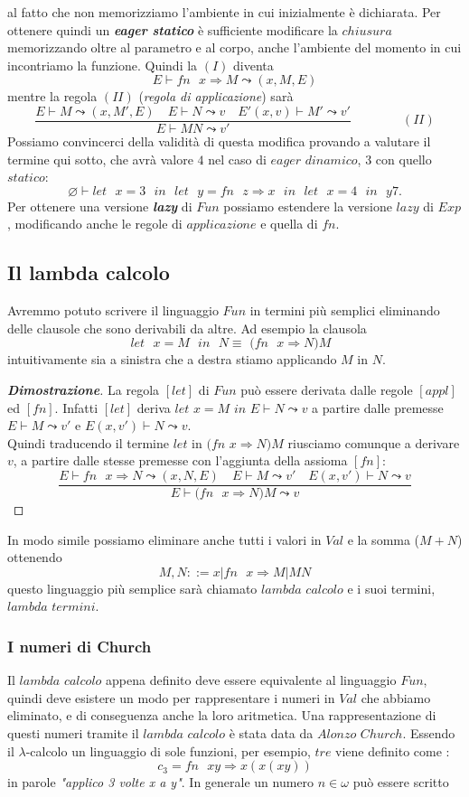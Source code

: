 \documentclass{article}
\theoremstyle{definition}
\theoremstyle{definition}
\theoremstyle{definition}
\theoremstyle{remark}
\begin{document}
al fatto che non memorizziamo l'ambiente in cui inizialmente è dichiarata. Per ottenere quindi un \textbf{\textit{eager statico}} è sufficiente modificare la $chiusura$ memorizzando oltre al parametro e al corpo, anche l'ambiente
del momento in cui incontriamo la funzione.
Quindi la $(I)$ diventa
$$E\vdash\text{$fn$ $x\Rightarrow M$}\leadsto(x,M,E)$$
mentre la regola $(II)$ (\textit{regola di applicazione}) sarà
$$\frac{E\vdash M \leadsto (x,M',E) \quad E \vdash N\leadsto v \quad E'(x,v)\vdash M'\leadsto v'}{E\vdash MN\leadsto v'}\qquad \qquad (II)$$
Possiamo convincerci della validità di questa modifica provando a valutare il termine qui sotto, che avrà valore $4$ nel caso di $eager$ $dinamico$, $3$ con quello $statico$:
$$\varnothing\vdash \text{$let$ $x=3$ $in$ $let$ $y=fn$ $z\Rightarrow x$ $in$ $let$ $x=4$ $in$ $y7$.}$$
Per ottenere una versione \textbf{\textit{lazy}} di $Fun$ possiamo estendere la versione $lazy$ di $Exp$, modificando anche le regole di $applicazione$ e quella di $fn$.
\subsection{Il lambda calcolo}
Avremmo potuto scrivere il linguaggio $Fun$ in termini più semplici eliminando delle clausole che sono derivabili da altre. Ad esempio la clausola
$$\text{$let$ $x=M$ $in$ $N \equiv$ ($fn$ $x\Rightarrow N)M$  }$$
intuitivamente sia a sinistra che a destra stiamo applicando $M$ in $N$.
\begin{proof}[\textbf{Dimostrazione}]
    La regola $[let]$ di $Fun$ può essere derivata dalle regole  $[appl]$ ed $[fn]$. Infatti $[let]$ deriva $let$ $x=M$ $in$ $E\vdash N\leadsto v$ a partire dalle premesse
    $E\vdash M\leadsto v'$  e $E(x,v')\vdash N \leadsto v$. \\Quindi  traducendo il termine $let$ in  $(fn$ $x\Rightarrow N)M$ riusciamo comunque a derivare $v$, a partire dalle stesse premesse  con l'aggiunta della assioma $[fn]$:
    $$\frac{E\vdash \text{$fn$ $x\Rightarrow N\leadsto (x,N,E)$}\quad E\vdash M\leadsto v' \quad E(x,v')\vdash N \leadsto v  }{E\vdash \text{$(fn$ $x\Rightarrow N)M\leadsto v$}}$$
\end{proof}
In modo simile possiamo eliminare anche tutti i valori in $Val$ e la somma ($M+N$) ottenendo
$$M,N ::= x|\text{$fn$ $x\Rightarrow M|MN$}$$
questo linguaggio più semplice  sarà chiamato $lambda$ $calcolo$ e i suoi termini, $lambda$ $termini$.
\subsubsection{I numeri di Church}
Il $lambda$ $calcolo$ appena definito deve essere equivalente al linguaggio $Fun$, quindi deve esistere un modo
per rappresentare i numeri in $Val$ che abbiamo eliminato, e di conseguenza anche la loro aritmetica.
Una rappresentazione di questi numeri tramite il $lambda$ $calcolo$ è stata data da $Alonzo$ $Church$. Essendo
il $\lambda$-calcolo un linguaggio di sole funzioni, per esempio, $tre$ viene definito come :
$$c_3 = fn\text{ $xy\Rightarrow x(x(xy))$}$$
in parole \textit{"applico 3 volte x a y"}. In generale un numero $n\in \omega$ può essere scritto
\end{document}
